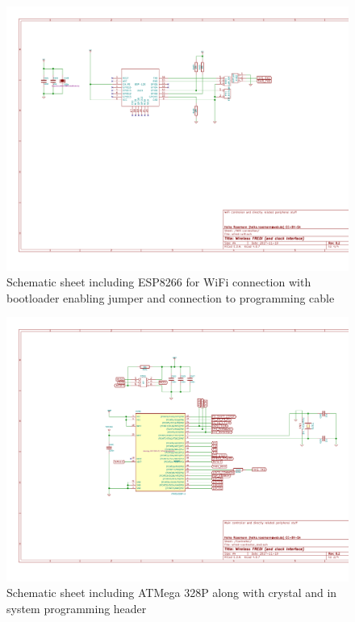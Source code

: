 \documentclass[11pt,a4paper]{scrartcl}
\begin{document}
\begin{figure}[tbh]
  \centering
  \includegraphics[width=\textwidth]{images/wfred-wifi-Wifi_connection}
  \caption{Schematic sheet including ESP8266 for WiFi connection with bootloader enabling jumper and connection to programming cable}
  \label{schematicPage2}
\end{figure}

\begin{figure}[tbh]
  \centering
  \includegraphics[width=\textwidth]{images/wfred-controller_rev2-Controller}
  \caption{Schematic sheet including ATMega 328P along with crystal and in system programming header}
  \label{schematicPage3}
\end{figure}
\end{document}
